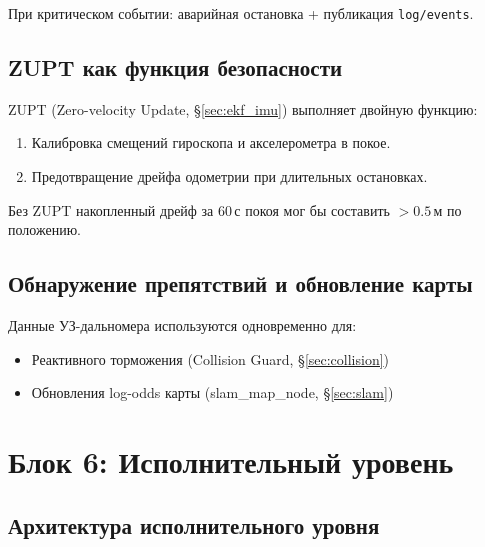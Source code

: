 \documentclass[12pt, a4paper]{article}
\begin{document}
При критическом событии: аварийная остановка + публикация \texttt{log/events}.

\subsection{ZUPT как функция безопасности}
ZUPT (Zero-velocity Update, \S\ref{sec:ekf_imu}) выполняет двойную функцию:
\begin{enumerate}[noitemsep]
  \item Калибровка смещений гироскопа и акселерометра в покое.
  \item Предотвращение дрейфа одометрии при длительных остановках.
\end{enumerate}
Без ZUPT накопленный дрейф за 60\,с покоя мог бы составить $>0.5$\,м по положению.

\subsection{Обнаружение препятствий и обновление карты}

Данные УЗ-дальномера используются одновременно для:
\begin{itemize}[noitemsep]
  \item Реактивного торможения (Collision Guard, \S\ref{sec:collision})
  \item Обновления log-odds карты (slam\_map\_node, \S\ref{sec:slam})
\end{itemize}

\newpage
\section{Блок 6: Исполнительный уровень}
\label{sec:execution}

\subsection{Архитектура исполнительного уровня}
\end{document}
